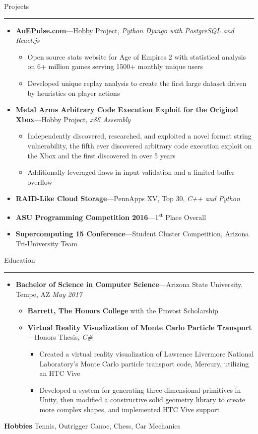 \documentclass[10pt,oneside]{article}
\newcommand{\hobbies}{Tennis, Outrigger Canoe, Chess, Car Mechanics}
\newcommand{\sectitle}[1]{
  \begin{flushleft}{\selectfont\Large#1}\end{flushleft}
}
\newenvironment{ressection}[1]{
  \vspace{0pt}
  \sectitle{#1}
  \vspace{-10pt}\rule{\textwidth}{0.5pt}
  \vspace{-10pt}
  \begin{itemize}[leftmargin=13pt]
  \vspace{-2pt}
}{
  \end{itemize}
}
\newcommand{\ressubitem}[1]{
  \vspace{-1pt}
  \item[--] \begin{flushleft} #1 \end{flushleft}
}
\newcommand{\resmeditem}[2]{
  \vspace{-5pt}
  \item
  \textbf{#1}---#2
}
\newcommand{\resbigitemline}[3]{
  \vspace{-1pt}
  \item
  \textbf{#1}---#2
  \hfill
  \textit{#3}
}
\newcommand{\resbigitemlinenodate}[3]{
  \vspace{-1pt}
  \item
  \textbf{#1}---#2,
  \textit{#3}
}
\newenvironment{ressubsecline}[3]{
  \resbigitemline{#1}{#2}{#3}
  \vspace{-2pt}
  \begin{itemize}
}{
  \end{itemize}
  \vspace{-2pt}
}
\newenvironment{ressubseclinenodate}[3]{
  \resbigitemlinenodate{#1}{#2}{#3}
  \vspace{-2pt}
  \begin{itemize}
}{
  \end{itemize}
}
\begin{document}
\begin{ressection}{Projects}
  \begin{ressubseclinenodate}{AoEPulse.com}{Hobby Project}{Python Django with PostgreSQL and React.js}
    \ressubitem{Open source stats website for Age of Empires 2 with statistical analysis on 6+ million games serving 1500+ monthly unique users}
    \ressubitem{Developed unique replay analysis to create the first large dataset driven by heuristics on player actions}
  \end{ressubseclinenodate}
  \begin{ressubseclinenodate}{Metal Arms Arbitrary Code Execution Exploit for the Original Xbox}{Hobby Project}{x86 Assembly}
    \ressubitem{Independently discovered, researched, and exploited a novel format string vulnerability, the fifth ever discovered arbitrary code execution exploit on the Xbox and the first discovered in over 5 years}
    \ressubitem{Additionally leveraged flaws in input validation and a limited buffer overflow}
  \end{ressubseclinenodate}
  \resbigitemlinenodate{RAID-Like Cloud Storage}{PennApps XV, Top 30}{C++ and Python}
  \resmeditem{ASU Programming Competition 2016}{1\textsuperscript{st} Place Overall}
  \resmeditem{Supercomputing 15 Conference}{Student Cluster Competition,}{Arizona Tri-University Team}
\end{ressection}

\begin{ressection}{Education}
  \begin{ressubsecline}{Bachelor of Science in Computer Science}{Arizona State University, Tempe, AZ}{May 2017}
    \ressubitem{\textbf{Barrett, The Honors College} with the Provost Scholarship}
    \begin{ressubseclinenodate}{Virtual Reality Visualization of Monte Carlo Particle Transport}{Honors Thesis}{C\#}
      \ressubitem{Created a virtual reality visualization of Lawrence Livermore National Laboratory's Monte Carlo particle transport code, Mercury, utilizing an HTC Vive}
      \ressubitem{Developed a system for generating three dimensional primitives in Unity, then modified a constructive solid geometry library to create more complex shapes, and implemented HTC Vive support}
    \end{ressubseclinenodate}
  \end{ressubsecline}
\end{ressection}

\textbf{Hobbies} \hobbies \\
\end{document}
